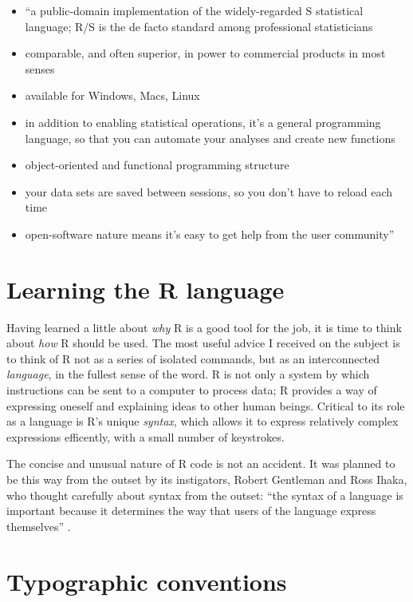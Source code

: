 \documentclass[a5paper, 11pt, twoside]{book}  %
\begin{document}
\begin{itemize}
\item ``a public-domain implementation of the widely-regarded S statistical
language; R/S is the de facto standard among professional statisticians
\item comparable, and often superior, in power to commercial products in most
senses
\item available for Windows, Macs, Linux
\item in addition to enabling statistical operations, it's a general programming
language, so that you can
automate your analyses and create new functions
\item object-oriented and functional programming structure
\item your data sets are saved between sessions, so you don't have to reload
each time
\item open-software nature means it’s easy to get help from the user
community''
\end{itemize}

\section{Learning the R language}

Having learned a little about \emph{why} R is a good tool for the job,
it is time to think about \emph{how} R should be used. The most
useful advice I received on the subject is to think of R not as a
series of isolated commands, but as an interconnected \emph{language},
in the fullest sense of the word. R is not only a system by which
instructions can be sent to a computer to process data; R provides a way
of expressing oneself and explaining ideas to other human beings.
Critical to its role as a language is R's unique \emph{syntax}, which allows it
to express relatively complex expressions efficently, with a small number of
keystrokes.

The concise and unusual nature of R code
is not an accident. It was planned to be this way from the
outset by its instigators, Robert Gentleman and Ross Ihaka, who thought
carefully about syntax from the outset:
``the syntax of a language is important
because it determines
the way that users of the language express themselves'' \citep[p.~300]{Ihaka2014}.

\section{Typographic conventions}
\end{document}
